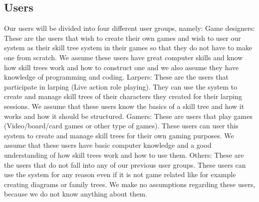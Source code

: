 \documentclass[12pt]{article}
\begin{document}
    \subsection{Users}
    Our users will be divided into four different user groups, namely:\newline\newline
    Game designers: These are the users that wish to create their own games and wish to user our system as their skill tree system in their games so that they do not have to make one from scratch. We assume these users have great computer skills and know how skill trees work and how to construct one and we also assume they have knowledge of programming and coding.\newline\newline
    Larpers: These are the users that participate in larping (Live action role playing). They can use the system to create and manage skill trees of their characters they created for their larping sessions. We assume that these users know the basics of a skill tree and how it works and how it should be structured.\newline\newline
    Gamers: These are users that play games (Video/board/card games or other type of games). These users can user this system to create and manage skill trees for their own gaming purposes. We assume that these users have basic computer knowledge and a good understanding of how skill trees work and how to use them.\newline\newline
    Others: These are the users that do not fall into any of our previous user groups. These users can use the system for any reason even if it is not game related like for example creating diagrams or family trees. We make no assumptions regarding these users, because we do not know anything about them.
  
    
\end{document}
